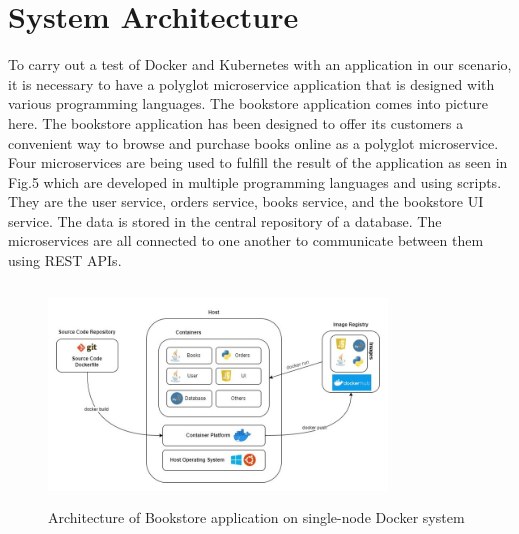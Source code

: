 \section{System Architecture}
To carry out a test of Docker and Kubernetes with an application in our scenario, it is necessary to have a polyglot microservice application that is designed with various programming languages. The bookstore application comes into picture here. The bookstore application has been designed to offer its customers a convenient way to browse and purchase books online as a polyglot microservice. Four microservices are being used to fulfill the result of the application as seen in Fig.5 which are developed in multiple programming languages and using scripts. They are the user service, orders service, books service, and the bookstore UI service. The data is stored in the central repository of a database. The microservices are all connected to one another to communicate between them using REST APIs.
\begin{figure}
    \centering
    \includegraphics[width=9cm, height=5.8cm]{images/Docker_architecture.jpg}
    \caption{Architecture of Bookstore application on single-node Docker system}
    \label{fig:my_label}
\end{figure}
